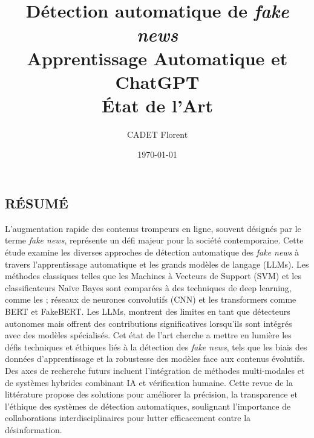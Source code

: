 \documentclass[a4paper,12pt, twocolumn]{article}
\title{\textbf{ Détection automatique de \textit{fake news} \\ Apprentissage Automatique et ChatGPT} \\\large État de l'Art}
\author{CADET Florent}
\date{\today}
\begin{document}
\begin{onecolumn}
\maketitle
\thispagestyle{empty}  %
\newpage

    
\newpage

\section*{RÉSUMÉ}
\label{chap:resume}
L'augmentation rapide des contenus trompeurs en ligne, souvent désignés par le terme \textit{fake news}, représente un défi majeur pour la société contemporaine. Cette étude examine les diverses approches de détection automatique des \textit{fake news} à travers l'apprentissage automatique et les grands modèles de langage (LLMs). Les méthodes classiques telles que les Machines à Vecteurs de Support (SVM) et les classificateurs Naïve Bayes sont comparées à des techniques de deep learning, comme les ; réseaux de neurones convolutifs (CNN) et les transformers comme BERT et FakeBERT. Les LLMs, montrent des limites en tant que détecteurs autonomes mais offrent des contributions significatives lorsqu'ils sont intégrés avec des modèles spécialisés. Cet état de l'art cherche a  mettre en lumière les défis techniques et éthiques liés à la détection des \textit{fake news}, tels que les biais des données d'apprentissage et la robustesse des modèles face aux contenus évolutifs. Des axes de recherche futurs incluent l'intégration de méthodes multi-modales et de systèmes hybrides combinant IA et vérification humaine. Cette revue de la littérature propose des solutions pour améliorer la précision, la transparence et l'éthique des systèmes de détection automatiques, soulignant l'importance de collaborations interdisciplinaires pour lutter efficacement contre la désinformation.


\end{onecolumn}
\end{document}
